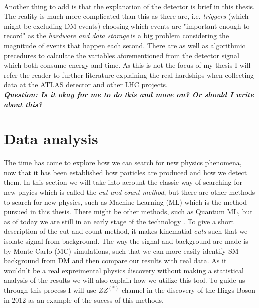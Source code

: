 \documentclass[14pt, a4paper]{book}
\begin{document}
\\Another thing to add is that the explanation of the detector is brief in this thesis. The reality is much more complicated than this as there are, i.e. \textit{triggers} (which might be excluding DM events) choosing which events are 
"important enough to record" as the \textit{hardware and data storage} is a big problem considering the magnitude of events that happen each second. There are as well as algorithmic precedures to calculate the variables aforementioned from the detector signal 
which both consume energy and time. As this is not the focus of my thesis I will refer the reader to further literature explaining the real hardships when collecting data at the ATLAS detector and other LHC projects. \cite{Trigger_1}\\
\textit{\textbf{Question: Is it okay for me to do this and move on? Or should I write about this?}}





\clearpage
\section{Data analysis}
The time has come to explore how we can search for new physics phenomena, now that it has been established how particles are produced and how we detect them. In this section we will take into account the classic way of searching for new phyics which is called 
the \textit{cut and count method}, but there are other methods to search for new physics, such as Machine Learning (ML) which is the method pursued in this thesis. There might be other methods, such as 
Quantum ML, but as of today we are still in an early stage of the technology \cite{QML}. To give a short description of the cut and count method, it makes kinematial \textit{cuts} such that we isolate signal from background. The way 
the signal and background are made is by Monte Carlo (MC) simulations, such that we can more easily identify SM background from DM and then compare our results with real data. As it wouldn't be a real expreimental physics discovery without making a statistical 
analysis of the results we will also explain how we utilize this tool. To guide us through this process I will use $ZZ^{(*)}$ channel in the discovery of the Higgs Boson in 2012 \cite{Higgs_discovery_2012} as an example of the sucess of this methods.
\end{document}
